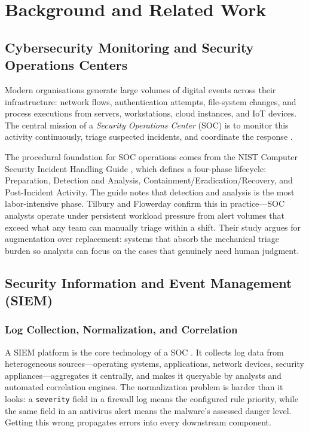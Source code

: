 
\chapter{Background and Related Work}

\label{chap:background-related-work}


\section{Cybersecurity Monitoring and Security Operations Centers}

Modern organisations generate large volumes of digital events across their infrastructure:
network flows, authentication attempts, file-system changes, and process executions
from servers, workstations, cloud instances, and IoT devices.
The central mission of a \textit{Security Operations Center} (SOC) is to monitor this
activity continuously, triage suspected incidents, and coordinate the response
\cite{nist80061, nist80092}.

The procedural foundation for SOC operations comes from the NIST Computer Security Incident Handling Guide \cite{nist80061}, which defines a four-phase lifecycle: Preparation, Detection and Analysis, Containment/Eradication/Recovery, and Post-Incident Activity. The guide notes that detection and analysis is the most labor-intensive phase. Tilbury and Flowerday \cite{tilbury2024humans} confirm this in practice---SOC analysts operate under persistent workload pressure from alert volumes that exceed what any team can manually triage within a shift. Their study argues for augmentation over replacement: systems that absorb the mechanical triage burden so analysts can focus on the cases that genuinely need human judgment.

\section{Security Information and Event Management (SIEM)}

\subsection{Log Collection, Normalization, and Correlation}

A SIEM platform is the core technology of a SOC \cite{nist80092}. It collects log data from heterogeneous sources---operating systems, applications, network devices, security appliances---aggregates it centrally, and makes it queryable by analysts and automated correlation engines. The normalization problem is harder than it looks: a \texttt{severity} field in a firewall log means the configured rule priority, while the same field in an antivirus alert means the malware's assessed danger level. Getting this wrong propagates errors into every downstream component.

